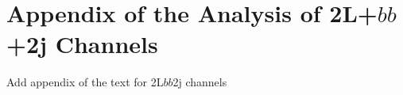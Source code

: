\section{Appendix of the Analysis of 2L+$bb$+2j Channels }
\label{sec:AppLLbb2j}
Add appendix of the text for 2L$bb$2j channels


